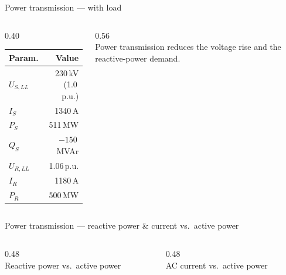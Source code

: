 \begin{frame}{Power transmission --- with load}
  \begin{columns}[c,onlytextwidth]
    \begin{column}{0.40\textwidth}
      \renewcommand{\arraystretch}{1.2}
      \begin{tabular}{@{}l r@{}}
        \textbf{Param.} & \textbf{Value} \\
        \hline
        $U_{S,LL}$ & 230\,kV (1.0\,p.u.) \\
        $I_S$ & 1340\,A \\
        $P_S$ & 511\,MW \\
        $Q_S$ & $-150$\,MVAr \\
        $U_{R,LL}$ & 1.06\,p.u. \\
        $I_R$ & 1180\,A \\
        $P_R$ & 500\,MW \\
        \hline
      \end{tabular}
    \end{column}
    \begin{column}{0.56\textwidth}\centering
      \\[0.3em]
      {\footnotesize Power transmission reduces the voltage rise and the reactive-power demand.}
    \end{column}
  \end{columns}
\end{frame}

\begin{frame}{Power transmission --- reactive power \& current vs.\ active power}
  \begin{columns}[c,onlytextwidth]
    \begin{column}{0.48\textwidth}\centering
      \\[0.3em]
      {\footnotesize Reactive power vs.\ active power}
    \end{column}
    \begin{column}{0.48\textwidth}\centering
      \\[0.3em]
      {\footnotesize AC current vs.\ active power}
    \end{column}
  \end{columns}
\end{frame}

